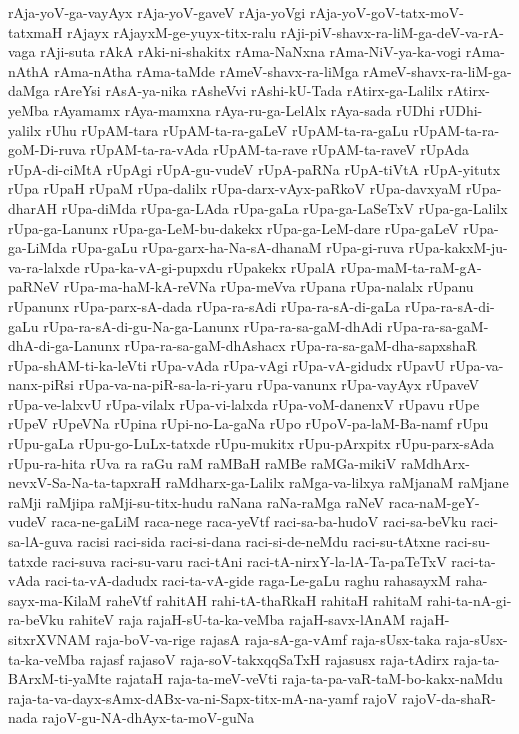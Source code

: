 {rAja-yoV-ga-vayAyx
rAja-yoV-gaveV
rAja-yoVgi
rAja-yoV-goV-tatx-moV-tatxmaH
rAjayx
rAjayxM-ge-yuyx-titx-ralu
rAji-piV-shavx-ra-liM-ga-deV-va-rA-vaga
rAji-suta
rAkA
rAki-ni-shakitx
rAma-NaNxna
rAma-NiV-ya-ka-vogi
rAma-nAthA
rAma-nAtha
rAma-taMde
rAmeV-shavx-ra-liMga
rAmeV-shavx-ra-liM-ga-daMga
rAreYsi
rAsA-ya-nika
rAsheVvi
rAshi-kU-Tada
rAtirx-ga-Lalilx
rAtirx-yeMba
rAyamamx
rAya-mamxna
rAya-ru-ga-LelAlx
rAya-sada
rUDhi
rUDhi-yalilx
rUhu
rUpAM-tara
rUpAM-ta-ra-gaLeV
rUpAM-ta-ra-gaLu
rUpAM-ta-ra-goM-Di-ruva
rUpAM-ta-ra-vAda
rUpAM-ta-rave
rUpAM-ta-raveV
rUpAda
rUpA-di-ciMtA
rUpAgi
rUpA-gu-vudeV
rUpA-paRNa
rUpA-tiVtA
rUpA-yitutx
rUpa
rUpaH
rUpaM
rUpa-dalilx
rUpa-darx-vAyx-paRkoV
rUpa-davxyaM
rUpa-dharAH
rUpa-diMda
rUpa-ga-LAda
rUpa-gaLa
rUpa-ga-LaSeTxV
rUpa-ga-Lalilx
rUpa-ga-Lanunx
rUpa-ga-LeM-bu-dakekx
rUpa-ga-LeM-dare
rUpa-gaLeV
rUpa-ga-LiMda
rUpa-gaLu
rUpa-garx-ha-Na-sA-dhanaM
rUpa-gi-ruva
rUpa-kakxM-ju-va-ra-lalxde
rUpa-ka-vA-gi-pupxdu
rUpakekx
rUpalA
rUpa-maM-ta-raM-gA-paRNeV
rUpa-ma-haM-kA-reVNa
rUpa-meVva
rUpana
rUpa-nalalx
rUpanu
rUpanunx
rUpa-parx-sA-dada
rUpa-ra-sAdi
rUpa-ra-sA-di-gaLa
rUpa-ra-sA-di-gaLu
rUpa-ra-sA-di-gu-Na-ga-Lanunx
rUpa-ra-sa-gaM-dhAdi
rUpa-ra-sa-gaM-dhA-di-ga-Lanunx
rUpa-ra-sa-gaM-dhAshacx
rUpa-ra-sa-gaM-dha-sapxshaR
rUpa-shAM-ti-ka-leVti
rUpa-vAda
rUpa-vAgi
rUpa-vA-gidudx
rUpavU
rUpa-va-nanx-piRsi
rUpa-va-na-piR-sa-la-ri-yaru
rUpa-vanunx
rUpa-vayAyx
rUpaveV
rUpa-ve-lalxvU
rUpa-vilalx
rUpa-vi-lalxda
rUpa-voM-danenxV
rUpavu
rUpe
rUpeV
rUpeVNa
rUpina
rUpi-no-La-gaNa
rUpo
rUpoV-pa-laM-Ba-namf
rUpu
rUpu-gaLa
rUpu-go-LuLx-tatxde
rUpu-mukitx
rUpu-pArxpitx
rUpu-parx-sAda
rUpu-ra-hita
rUva
ra
raGu
raM
raMBaH
raMBe
raMGa-mikiV
raMdhArx-nevxV-Sa-Na-ta-tapxraH
raMdharx-ga-Lalilx
raMga-va-lilxya
raMjanaM
raMjane
raMji
raMjipa
raMji-su-titx-hudu
raNana
raNa-raMga
raNeV
raca-naM-geY-vudeV
raca-ne-gaLiM
raca-nege
raca-yeVtf
raci-sa-ba-hudoV
raci-sa-beVku
raci-sa-lA-guva
racisi
raci-sida
raci-si-dana
raci-si-de-neMdu
raci-su-tAtxne
raci-su-tatxde
raci-suva
raci-su-varu
raci-tAni
raci-tA-nirxY-la-lA-Ta-paTeTxV
raci-ta-vAda
raci-ta-vA-dadudx
raci-ta-vA-gide
raga-Le-gaLu
raghu
rahasayxM
raha-sayx-ma-KilaM
raheVtf
rahitAH
rahi-tA-thaRkaH
rahitaH
rahitaM
rahi-ta-nA-gi-ra-beVku
rahiteV
raja
rajaH-sU-ta-ka-veMba
rajaH-savx-lAnAM
rajaH-sitxrXVNAM
raja-boV-va-rige
rajasA
raja-sA-ga-vAmf
raja-sUsx-taka
raja-sUsx-ta-ka-veMba
rajasf
rajasoV
raja-soV-takxqqSaTxH
rajasusx
raja-tAdirx
raja-ta-BArxM-ti-yaMte
rajataH
raja-ta-meV-veVti
raja-ta-pa-vaR-taM-bo-kakx-naMdu
raja-ta-va-dayx-sAmx-dABx-va-ni-Sapx-titx-mA-na-yamf
rajoV
rajoV-da-shaR-nada
rajoV-gu-NA-dhAyx-ta-moV-guNa
}
